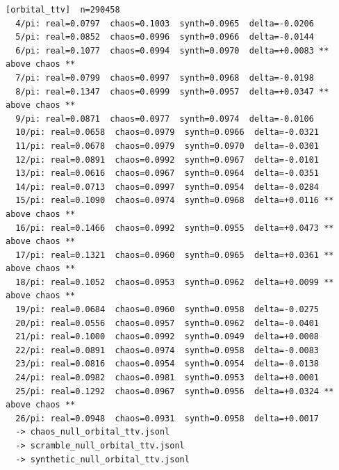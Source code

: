 \documentclass[11pt, letterpaper, openany]{book}
\begin{document}
\begin{empiricalbox}
\begin{lstlisting}[style=terminal]
[orbital_ttv]  n=290458
  4/pi: real=0.0797  chaos=0.1003  synth=0.0965  delta=-0.0206
  5/pi: real=0.0852  chaos=0.0996  synth=0.0966  delta=-0.0144
  6/pi: real=0.1077  chaos=0.0994  synth=0.0970  delta=+0.0083 ** above chaos **
  7/pi: real=0.0799  chaos=0.0997  synth=0.0968  delta=-0.0198
  8/pi: real=0.1347  chaos=0.0999  synth=0.0957  delta=+0.0347 ** above chaos **
  9/pi: real=0.0871  chaos=0.0977  synth=0.0974  delta=-0.0106
  10/pi: real=0.0658  chaos=0.0979  synth=0.0966  delta=-0.0321
  11/pi: real=0.0678  chaos=0.0979  synth=0.0970  delta=-0.0301
  12/pi: real=0.0891  chaos=0.0992  synth=0.0967  delta=-0.0101
  13/pi: real=0.0616  chaos=0.0967  synth=0.0964  delta=-0.0351
  14/pi: real=0.0713  chaos=0.0997  synth=0.0954  delta=-0.0284
  15/pi: real=0.1090  chaos=0.0974  synth=0.0968  delta=+0.0116 ** above chaos **
  16/pi: real=0.1466  chaos=0.0992  synth=0.0955  delta=+0.0473 ** above chaos **
  17/pi: real=0.1321  chaos=0.0960  synth=0.0965  delta=+0.0361 ** above chaos **
  18/pi: real=0.1052  chaos=0.0953  synth=0.0962  delta=+0.0099 ** above chaos **
  19/pi: real=0.0684  chaos=0.0960  synth=0.0958  delta=-0.0275
  20/pi: real=0.0556  chaos=0.0957  synth=0.0962  delta=-0.0401
  21/pi: real=0.1000  chaos=0.0992  synth=0.0949  delta=+0.0008
  22/pi: real=0.0891  chaos=0.0974  synth=0.0958  delta=-0.0083
  23/pi: real=0.0816  chaos=0.0954  synth=0.0954  delta=-0.0138
  24/pi: real=0.0982  chaos=0.0981  synth=0.0953  delta=+0.0001
  25/pi: real=0.1292  chaos=0.0967  synth=0.0956  delta=+0.0324 ** above chaos **
  26/pi: real=0.0948  chaos=0.0931  synth=0.0958  delta=+0.0017
  -> chaos_null_orbital_ttv.jsonl
  -> scramble_null_orbital_ttv.jsonl
  -> synthetic_null_orbital_ttv.jsonl


\end{lstlisting}
\end{empiricalbox}
\end{document}
